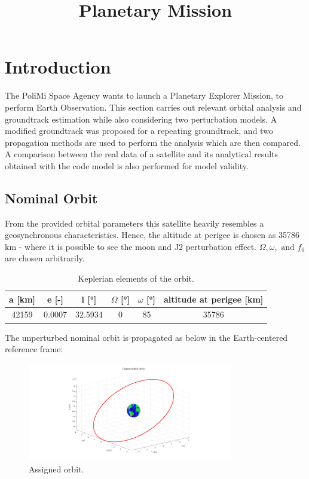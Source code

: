 \documentclass{article}
\title{Planetary Mission}
\begin{document}
	
	
\section{Introduction}
The  PoliMi  Space  Agency  wants  to  launch  a  Planetary  Explorer  Mission,  to  perform  Earth Observation. This section carries out relevant orbital analysis and groundtrack estimation while also considering two perturbation models. A modified groundtrack was proposed for a repeating groundtrack, and two propagation methods are used to perform the analysis which are then compared. A comparison between the real data of a satellite and its analytical results obtained with the code model is also performed for model validity. 

\subsection{Nominal Orbit}

From the provided orbital parameters this satellite heavily resembles a geosynchronous characteristics. Hence, the altitude at perigee is chosen as 35786 km - where it is possible to see the moon and J2 perturbation effect. $\Omega, \omega, \text{ and } f_0$ are chosen arbitrarily.


\begin{table}[ht]
	\centering
	\label{tab:keplerian_elements}
	\begin{tabular}{|c|c|c|c|c|c|}
		\hline
		a [km] & e [-] & i [°] & $\Omega$ [°] & $\omega$ [°] & altitude at perigee [km] \\
		\hline
		42159 & 0.0007 & 32.5934 & 0 & 85 & 35786 \\
		\hline
	\end{tabular}
	\caption{Keplerian elements of the orbit.}
	\label{tab:keplerian_elements}
\end{table}
\begin{flushleft}
	The unperturbed nominal orbit is propagated as below in the Earth-centered reference frame:
\end{flushleft}

\begin{figure}[ht]
	\centering
	\includegraphics[width=0.8\textwidth]{nominal_orbit.png}
	\caption{Assigned orbit.}
	\label{fig:nominal_orbit}
\end{figure}
\end{document}
